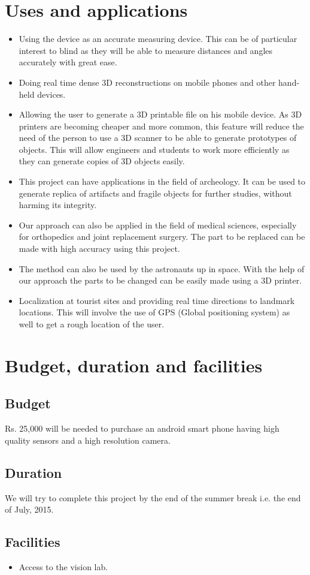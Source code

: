 \documentclass{article}
\begin{document}
	
	

	\section{Uses and applications}
			\begin{itemize}
				\item Using the device as an accurate measuring device. This can be of particular interest to blind as they will be able to measure distances and angles accurately with great ease.
				\item Doing real time dense 3D reconstructions on mobile phones and other hand-held devices. 
				\item Allowing the user to generate a 3D printable file on his mobile device. As 3D printers are becoming cheaper and more common, this feature will reduce the need of the person to use a 3D scanner to be able to generate prototypes of objects. This will allow engineers and students to work more efficiently as they can generate copies of 3D objects easily.
				\item This project can have applications in the field of archeology. It can be used to generate replica of artifacts and fragile objects for further studies, without harming its integrity.
				\item Our approach can also be applied in the field of medical sciences, especially for orthopedics and joint replacement surgery. The part to be replaced can be made with high accuracy using this project.
				\item The method can also be used by the astronauts up in space. With the help of our approach the parts to be changed can be easily made using a 3D printer.
				\item Localization at tourist sites and providing real time directions to landmark locations. This will involve the use of GPS (Global positioning system) as well to get a rough location of the user.
			\end{itemize}
	\newpage
	\section{Budget, duration and facilities}	
		\subsection{Budget}
			Rs. 25,000 will be needed to purchase an android smart phone having high quality sensors and a high resolution camera.
		\subsection{Duration}
			We will try to complete this project by the end of the summer break i.e. the end of July, 2015. 
		\subsection{Facilities}
		    \begin{itemize}
		    \item Access to the vision lab.
		    \end{itemize}
\end{document}
